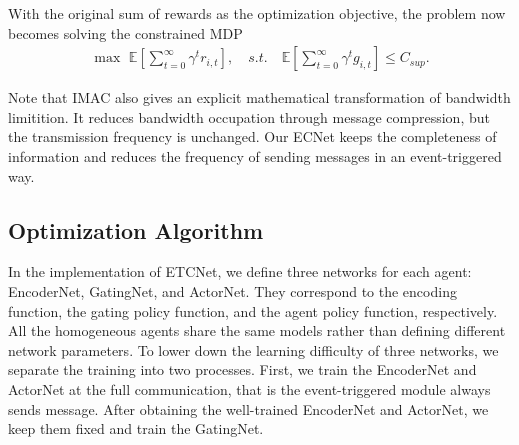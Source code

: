 \documentclass[letterpaper]{article} %
\begin{document}
With the original sum of rewards as the optimization objective, the problem now becomes solving the constrained MDP
\begin{equation} \label{eq:optimization}
\begin{split}
\max\,\, \mathbb{E}\left[ \sum_{t=0}^\infty \gamma^t r_{i,t} \right], \quad
s.t.\quad
\mathbb{E}\left[ \sum_{t=0}^\infty \gamma^t  g_{i,t} \right] \leq C_{sup}.
\end{split}
\end{equation}

Note that IMAC \cite{imac} also gives an explicit mathematical transformation of bandwidth limitition.
It reduces bandwidth occupation through message compression, but the transmission frequency is unchanged.
Our ECNet keeps the completeness of information and reduces the frequency of sending messages in an event-triggered way.


\subsection{Optimization Algorithm}\label{sec:algorithm}


In the implementation of ETCNet, we define three networks for each agent: EncoderNet, GatingNet, and ActorNet. They correspond to the encoding function, the gating policy function, and the agent policy function, respectively. All the homogeneous agents share the same models rather than defining different network parameters.
To lower down the learning difficulty of three networks, we separate the training into two processes. First, we train the EncoderNet and ActorNet at the full communication, that is the event-triggered module always sends message. After obtaining the well-trained  EncoderNet and ActorNet, we keep them fixed and train the GatingNet.
\end{document}

